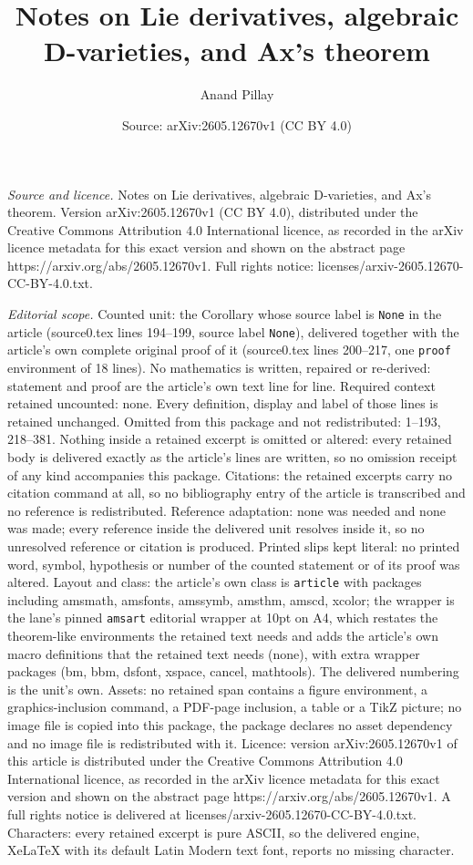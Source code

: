 \documentclass[10pt,a4paper]{amsart}
\title[Notes on Lie derivatives, algebraic D-varieties, and Ax's th]{Notes on Lie derivatives, algebraic D-varieties, and Ax's theorem}
\author{Anand Pillay}
\date{Source: arXiv:2605.12670v1 (CC BY 4.0)}
\begin{document}
\maketitle

\noindent\emph{Source and licence.} Notes on Lie derivatives, algebraic D-varieties, and Ax's theorem. Version arXiv:2605.12670v1 (CC BY 4.0), distributed under the Creative Commons Attribution 4.0 International licence, as recorded in the arXiv licence metadata for this exact version and shown on the abstract page https://arxiv.org/abs/2605.12670v1. Full rights notice: licenses/arxiv-2605.12670-CC-BY-4.0.txt.\par\smallskip

\noindent\textit{Editorial scope.} Counted unit: the Corollary whose source label is \texttt{None} in the article (source0.tex lines 194--199, source label \texttt{None}), delivered together with the article's own complete original proof of it (source0.tex lines 200--217, one \texttt{proof} environment of 18 lines). No mathematics is written, repaired or re-derived: statement and proof are the article's own text line for line. Required context retained uncounted: none. Every definition, display and label of those lines is retained unchanged. Omitted from this package and not redistributed: 1--193, 218--381. Nothing inside a retained excerpt is omitted or altered: every retained body is delivered exactly as the article's lines are written, so no omission receipt of any kind accompanies this package. Citations: the retained excerpts carry no citation command at all, so no bibliography entry of the article is transcribed and no reference is redistributed. Reference adaptation: none was needed and none was made; every reference inside the delivered unit resolves inside it, so no unresolved reference or citation is produced. Printed slips kept literal: no printed word, symbol, hypothesis or number of the counted statement or of its proof was altered. Layout and class: the article's own class is \texttt{article} with packages including amsmath, amsfonts, amssymb, amsthm, amscd, xcolor; the wrapper is the lane's pinned \texttt{amsart} editorial wrapper at 10pt on A4, which restates the theorem-like environments the retained text needs and adds the article's own macro definitions that the retained text needs (none), with extra wrapper packages (bm, bbm, dsfont, xspace, cancel, mathtools). The delivered numbering is the unit's own. Assets: no retained span contains a figure environment, a graphics-inclusion command, a PDF-page inclusion, a table or a TikZ picture; no image file is copied into this package, the package declares no asset dependency and no image file is redistributed with it. Licence: version arXiv:2605.12670v1 of this article is distributed under the Creative Commons Attribution 4.0 International licence, as recorded in the arXiv licence metadata for this exact version and shown on the abstract page https://arxiv.org/abs/2605.12670v1. A full rights notice is delivered at licenses/arxiv-2605.12670-CC-BY-4.0.txt. Characters: every retained excerpt is pure ASCII, so the delivered engine, XeLaTeX with its default Latin Modern text font, reports no missing character.
\end{document}
